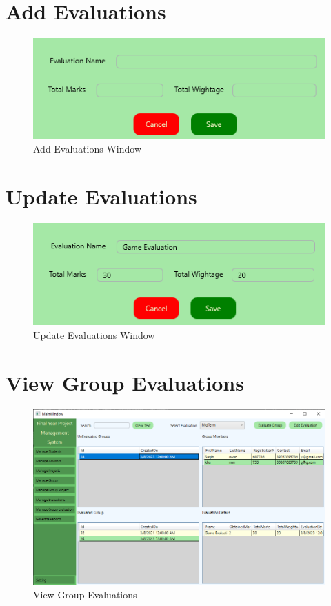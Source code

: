 \documentclass[a4paper, 12pt, oneside]{uet_thesis}
\begin{document}
\section{Add Evaluations}
\begin{figure}[h]
    \centering
    \includegraphics[width=1\textwidth]{Figures/AddEvaluation.png}
    \caption{Add Evaluations Window}
    \label{fig:my_label}
\end{figure}
\clearpage



\section{Update Evaluations}
\begin{figure}[h]
    \centering
    \includegraphics[width=1\textwidth]{Figures/UpdateEvaluation.png}
    \caption{Update Evaluations Window}
    \label{fig:my_label}
\end{figure}

\section{View Group Evaluations}
\begin{figure}[h]
    \centering
    \includegraphics[width=1\textwidth]{Figures/ViewGroupEvaluation.png}
    \caption{View Group Evaluations}
    \label{fig:my_label}
\end{figure}
\clearpage
\end{document}
